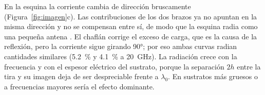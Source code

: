 \documentclass[11pt,letterpaper]{article}
\begin{document}
En la esquina la corriente cambia de dirección bruscamente (Figura~\ref{fig:imagen}c). Las contribuciones de los dos brazos ya no apuntan en la misma dirección y no se compensan entre sí, de modo que la esquina radia como una pequeña antena \cite{lewin}. El chaflán corrige el exceso de carga, que es la causa de la reflexión, pero la corriente sigue girando \ang{90}; por eso ambas curvas radian cantidades similares (\SI{5.2}{\percent} y \SI{4.1}{\percent} a \SI{20}{GHz}). La radiación crece con la frecuencia y con el espesor eléctrico del sustrato, porque la separación $2h$ entre la tira y su imagen deja de ser despreciable frente a $\lambda_0$. En sustratos más gruesos o a frecuencias mayores sería el efecto dominante.


\end{document}
